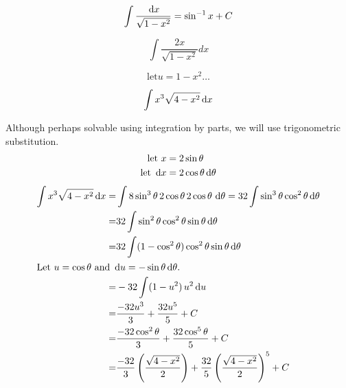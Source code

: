 \begin{ex}
  \[ \int \frac{\,\mathrm{d} x}{\sqrt{1-x^{2}}} = \sin^{-1}x+C \]
\end{ex}
\begin{ex}
  \[ \int \frac{2x}{\sqrt{1-x^2}}dx \]
  \begin{sol}

  \[ \text{let} u = 1-x^{2} \ldots \]
\end{sol}
\end{ex}
\begin{ex}
  \[ \int x^{3} \sqrt {4-x^2} \,\mathrm{d} x \]
  \begin{sol} Although perhaps solvable using integration by parts, we will use trigonometric substitution.
  \begin{align*}
    \text{let }  x &= 2 \sin{\theta} \\ \text{let } \,\mathrm{d} x &= 2\cos \theta \,\mathrm{d} \theta
  \end{align*}
  \begin{align*}
    \int x^{3} \sqrt {4-x^2} \,\mathrm{d} x
    =&\int 8\sin^3 \theta \, 2\cos\theta \, 2\cos\theta \, \,\mathrm{d}\theta
   =32 \int \sin^{3}\theta\cos^{2} \theta \,\mathrm{d}\theta \\
   =& 32 \int \sin^{2}\theta\cos^{2} \theta\sin \theta \,\mathrm{d}\theta \\
   =& 32 \int (1-\cos^{2}\theta) \cos^{2} \theta\sin \theta \,\mathrm{d}\theta \\
   \intertext{Let $u=\cos\theta$ and $\,\mathrm{d} u = -\sin \theta \,\mathrm{d} \theta$.}
   =&-32 \int (1-u^{2})\,u^{2}\,\mathrm{d} u \\
   =&\frac {-32u^3}{3}+\frac{32u^5}{5}+C \\
   =&\frac{-32\cos^{2}\theta}{3}+\frac{32\cos^{5}\theta}{5}+C \\
   =&\frac {-32}{3} \left(\frac{\sqrt{4-x^2}}{2}\right)+\frac {32}{5} \left(\frac{\sqrt{4-x^2}}{2}\right)^5+C \\
 \end{align*}
 \end{sol}
\end{ex}


